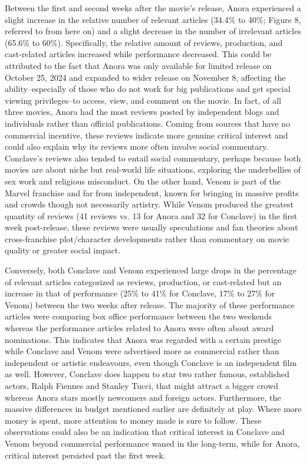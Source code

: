 \documentclass[letterpaper]{article} %
\begin{document}
Between the first and second weeks after the movie’s release, Anora experienced a slight increase in the relative number of relevant articles (34.4\% to 40\%; Figure 8, referred to from here on) and a slight decrease in the number of irrelevant articles (65.6\% to 60\%). Specifically, the relative amount of reviews, production, and cast-related articles increased while performance decreased. This could be attributed to the fact that Anora was only available for limited release on October 25, 2024 and expanded to wider release on November 8, affecting the ability–especially of those who do not work for big publications and get special viewing privileges–to access, view, and comment on the movie. In fact, of all three movies, Anora had the most reviews posted by independent blogs and individuals rather than official publications. Coming from sources that have no commercial incentive, these reviews indicate more genuine critical interest and could also explain why its reviews more often involve social commentary. Conclave’s reviews also tended to entail social commentary, perhaps because both movies are about niche but real-world life situations, exploring the underbellies of sex work and religious misconduct. On the other hand, Venom is part of the Marvel franchise and far from independent, known for bringing in massive profits and crowds though not necessarily artistry. While Venom produced the greatest quantity of reviews (41 reviews vs. 13 for Anora and 32 for Conclave) in the first week post-release, these reviews were usually speculations and fan theories about cross-franchise plot/character developments rather than commentary on movie quality or greater social impact.

Conversely, both Conclave and Venom experienced large drops in the percentage of relevant articles categorized as reviews, production, or cast-related but an increase in that of performance (25\% to 41\% for Conclave, 17\% to 27\% for Venom) between the two weeks after release. The majority of these performance articles were comparing box office performance between the two weekends whereas the performance articles related to Anora were often about award nominations. This indicates that Anora was regarded with a certain prestige while Conclave and Venom were advertised more as commercial rather than independent or artistic endeavours, even though Conclave is an independent film as well. However, Conclave does happen to star two rather famous, established actors, Ralph Fiennes and Stanley Tucci, that might attract a bigger crowd whereas Anora stars mostly newcomers and foreign actors. Furthermore, the massive differences in budget mentioned earlier are definitely at play. Where more money is spent, more attention to money made is sure to follow. These observations could also be an indication that critical interest in Conclave and Venom beyond commercial performance waned in the long-term, while for Anora, critical interest persisted past the first week. 
\end{document}
